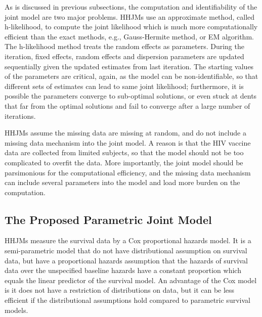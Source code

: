As is discussed in previous subsections, the computation and identifiability of the joint model are two major problems. HHJMs use an approximate method, called h-likelihood, to compute the joint likelihood which is much more computationally efficient than the exact methods, e.g., Gauss-Hermite method, or EM algorithm. The h-likelihood method treats the random effects as parameters. During the iteration, fixed effects, random effects and dispersion parameters are updated sequentially given the updated estimates from last iteration. The starting values of the parameters are critical, again, as the model can be non-identifiable, so that different sets of estimates can lead to same joint likelihood; furthermore, it is possible the parameters converge to sub-optimal solutions, or even stuck at dents that far from the optimal solutions and fail to converge after a large number of iterations.


HHJMs assume the missing data are missing at random, and do not include a missing data mechanism into the joint model. 
A reason is that the HIV vaccine data are collected from limited subjects, so that the model should not be too complicated to overfit the data. More importantly, the joint model should be parsimonious for the computational efficiency, and the missing data mechanism can include several parameters into the model and load more burden on the computation.





\subsection{The Proposed Parametric Joint Model}

HHJMs measure the survival data by a Cox proportional hazards model. It is a semi-parametric model that do not have distributional assumption on survival data, but have a proportional hazards assumption that the hazards of survival data over the unspecified baseline hazards have a constant proportion which equals the linear predictor of the survival model. An advantage of the Cox model is it does not have a restriction of distributions on data, but it can be less efficient if the distributional assumptions hold compared to parametric survival models.


